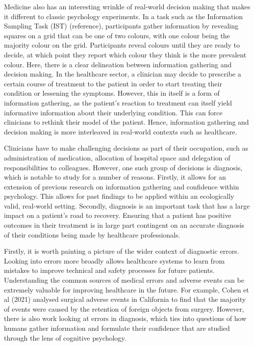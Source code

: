 \documentclass[a4paper, nobind]{templates/ociamthesis}
\begin{document}
Medicine also has an interesting wrinkle of real-world decision making that makes it different to classic psychology experiments. In a task such as the Information Sampling Task (IST) (reference), participants gather information by revealing squares on a grid that can be one of two colours, with one colour being the majority colour on the grid. Participants reveal colours until they are ready to decide, at which point they report which colour they think is the more prevalent colour. Here, there is a clear delineation between information gathering and decision making. In the healthcare sector, a clinician may decide to prescribe a certain course of treatment to the patient in order to start treating their condition or lessening the symptoms. However, this in itself is a form of information gathering, as the patient's reaction to treatment can itself yield informative information about their underlying condition. This can force clinicians to rethink their model of the patient. Hence, information gathering and decision making is more interleaved in real-world contexts such as healthcare.

Clinicians have to make challenging decisions as part of their occupation, such as administration of medication, allocation of hospital space and delegation of responsibilities to colleagues. However, one such group of decisions is diagnosis, which is notable to study for a number of reasons. Firstly, it allows for an extension of previous research on information gathering and confidence within psychology. This allows for past findings to be applied within an ecologically valid, real-world setting. Secondly, diagnosis is an important task that has a large impact on a patient's road to recovery. Ensuring that a patient has positive outcomes in their treatment is in large part contingent on an accurate diagnosis of their conditions being made by healthcare professionals.

Firstly, it is worth painting a picture of the wider context of diagnostic errors. Looking into errors more broadly allows healthcare systems to learn from mistakes to improve technical and safety processes for future patients. Understanding the common sources of medical errors and adverse events can be extremely valuable for improving healthcare in the future. For example, Cohen et al (2021) analysed surgical adverse events in California to find that the majority of events were caused by the retention of foreign objects from surgery. However, there is also work looking at errors in diagnosis, which ties into questions of how humans gather information and formulate their confidence that are studied through the lens of cognitive psychology.
\end{document}
